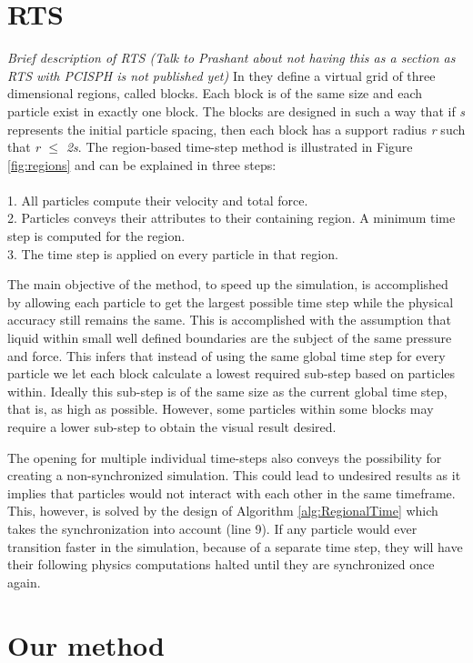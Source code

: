 \documentclass[../main.tex]{subfiles}
\begin{document}
\section{RTS}
\textit{Brief description of RTS (Talk to Prashant about not having this as a section as RTS with PCISPH is not published yet)}
In \cite{goswami2014regional} they define a virtual grid of three dimensional regions, called blocks. Each block is of the same size and each particle exist in exactly one block. The blocks are designed in such a way that if \textit{s} represents the initial particle spacing, then each block has a support radius \textit{r} such that \textit{r $\leq$ 2s}. The region-based time-step method is illustrated in Figure \ref{fig:regions} and can be explained in three steps:
\\
\\1. All particles compute their velocity and total force.
\\2. Particles conveys their attributes to their containing region. A minimum time step is computed for the region.
\\3. The time step is applied on every particle in that region. 

The main objective of the method, to speed up the simulation, is accomplished by allowing each particle to get the largest possible time step while the physical accuracy still remains the same. This is accomplished with the assumption that liquid within small well defined boundaries are the subject of the same pressure and force. This infers that instead of using the same global time step for every particle we let each block calculate a lowest required sub-step based on particles within. Ideally this sub-step is of the same size as the current global time step, that is, as high as possible. However, some particles within some blocks may require a lower sub-step to obtain the visual result desired. 

The opening for multiple individual time-steps also conveys the possibility for creating a non-synchronized simulation. This could lead to undesired results as it implies that particles would not interact with each other in the same timeframe. This, however, is solved by the design of Algorithm \ref{alg:RegionalTime} which takes the synchronization into account (line 9). If any particle would ever transition faster in the simulation, because of a separate time step, they will have their following physics computations halted until they are synchronized once again.


\section{Our method}

\end{document}
